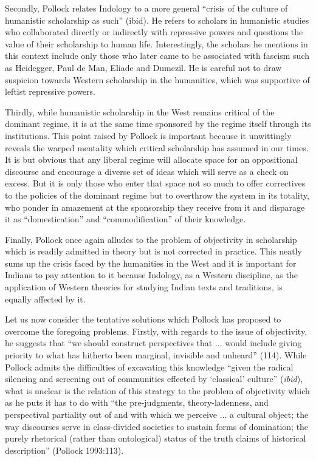 Secondly, Pollock relates Indology to a more general “crisis of the culture of humanistic scholarship as such” (ibid). He refers to scholars in humanistic studies who collaborated directly or indirectly with repressive powers and questions the value of their scholarship to human life. Interestingly, the scholars he mentions in this context include only those who later came to be associated with fascism such as Heidegger, Paul de Man, Eliade and Dumezil. He is careful not to draw suspicion towards Western scholarship in the humanities, which was supportive of leftist repressive powers. 

Thirdly, while humanistic scholarship in the West remains critical of the dominant regime, it is at the same time sponsored by the regime itself through its institutions. This point raised by Pollock is important because it unwittingly reveals the warped mentality which critical scholarship has assumed in our times. It is but obvious that any liberal regime will allocate space for an oppositional discourse and encourage a diverse set of ideas which will serve as a check on excess. But it is only those who enter that space not so much to offer correctives to the policies of the dominant regime but to overthrow the system in its totality, who ponder in amazement at the sponsorship they receive from it and disparage it as “domestication” and “commodification” of their knowledge. 


Finally, Pollock once again alludes to the problem of objectivity in scholarship which is readily admitted in theory but is not corrected in practice. This neatly sums up the crisis faced by the humanities in the West and it is important for Indians to pay attention to it because Indology, as a Western discipline, as the application of Western theories for studying Indian texts and traditions, is equally affected by it.

Let us now consider the tentative solutions which Pollock has proposed to overcome the foregoing problems. Firstly, with regards to the issue of objectivity, he suggests that “we should construct perspectives that $\ldots$ would include giving priority to what has hitherto been marginal, invisible and unheard” (114). While Pollock admits the difficulties of excavating this knowledge “given the radical silencing and screening out of communities effected by ‘classical’ culture” ({\sl ibid}), what is unclear is the relation of this strategy to the problem of objectivity which as he puts it has to do with “the pre-judgments, theory-ladenness, and perspectival partiality out of and with which we perceive $\ldots$ a cultural object; the way discourses serve in class-divided societies to sustain forms of domination; the purely rhetorical (rather than ontological) status of the truth claims of historical description” (Pollock 1993:113). 


